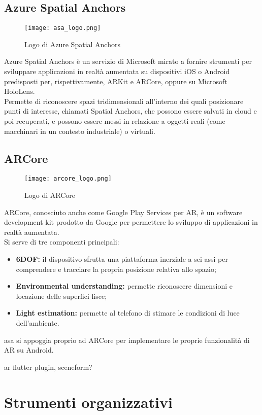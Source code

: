 \subsection{Azure Spatial Anchors}
\begin{figure}[ht]
    \centering
    \texttt{[image: asa\_logo.png]}
    \caption{Logo di Azure Spatial Anchors}
\end{figure} \aCapo{}
Azure Spatial Anchors è un servizio di Microsoft mirato a fornire strumenti per sviluppare applicazioni in realtà aumentata su dispositivi iOS o Android predisposti per, rispettivamente, ARKit e ARCore, oppure su Microsoft HoloLens.\\
Permette di riconoscere spazi tridimensionali all'interno dei quali posizionare punti di interesse, chiamati Spatial Anchors, che possono essere salvati in cloud e poi recuperati, e possono essere messi in relazione a oggetti reali (come macchinari in un contesto industriale) o virtuali.

\subsection{ARCore}
\begin{figure}[ht]
    \centering
    \texttt{[image: arcore\_logo.png]}
    \caption{Logo di ARCore}
\end{figure} \aCapo{}
ARCore, conosciuto anche come Google Play Services per AR, è un software development kit prodotto da Google per permettere lo sviluppo di applicazioni in realtà aumentata.\\
Si serve di tre componenti principali:
\begin{itemize}
    \item \textbf{6DOF:} il dispositivo sfrutta una piattaforma inerziale a sei assi per comprendere e tracciare la propria posizione relativa allo spazio;
    \item \textbf{Environmental understanding:} permette riconoscere dimensioni e locazione delle superfici lisce;
    \item \textbf{Light estimation:} permette al telefono di stimare le condizioni di luce dell'ambiente.
\end{itemize}
asa si appoggia proprio ad ARCore per implementare le proprie funzionalità di AR su Android.

\todo
\textcolor{todoOrange}{ar flutter plugin, sceneform?}


\section{Strumenti organizzativi}

